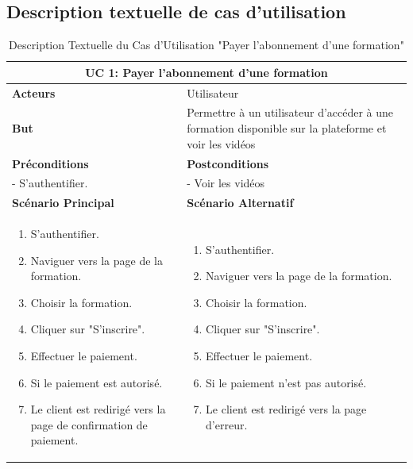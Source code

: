 \subsection{Description textuelle de cas d’utilisation}

\begin{minipage}{\textwidth}
\begin{table}[H]
\centering
\begin{tabular}{| m{8cm} | m{8cm} |}
\hline
\multicolumn{2}{|c|}{\textbf{UC 1:} Payer l'abonnement d'une formation} \\ \hline
\textbf{Acteurs} & Utilisateur \\ \hline
\textbf{But} & Permettre à un utilisateur d'accéder à une formation disponible sur la plateforme et voir les vidéos \\ \hline
\textbf{Préconditions} & \textbf{Postconditions} \\ \hline
- S'authentifier. & - Voir les vidéos \\ \hline
\textbf{Scénario Principal} & \textbf{Scénario Alternatif} \\ \hline
\begin{enumerate}
    \item S'authentifier.
    \item Naviguer vers la page de la formation.
    \item Choisir la formation.
    \item Cliquer sur "S'inscrire".
    \item Effectuer le paiement.
    \item Si le paiement est autorisé.
    \item Le client est redirigé vers la page de confirmation de paiement.
\end{enumerate} & 
\begin{enumerate}
    \item S'authentifier.
    \item Naviguer vers la page de la formation.
    \item Choisir la formation.
    \item Cliquer sur "S'inscrire".
    \item Effectuer le paiement.
    \item Si le paiement n'est pas autorisé.
    \item Le client est redirigé vers la page d’erreur.
\end{enumerate} \\ \hline
\end{tabular}
\caption{Description Textuelle du Cas d'Utilisation "Payer l'abonnement d'une formation"}
\label{tab:use_case_description_1}
\end{table}
\end{minipage}

